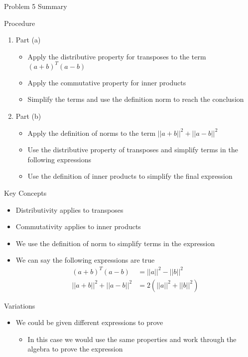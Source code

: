 \begin{summary}{Problem 5 Summary}
    \begin{statement}{Procedure}
        \begin{enumerate}[label = (\alph*)]
            \item Part (a)
            \begin{itemize}
                \item Apply the distributive property for transposes to the term $(a+b)^{T}(a-b)$
                \item Apply the commutative property for inner products 
                \item Simplify the terms and use the definition norm to reach the conclusion
            \end{itemize}
            \item Part (b)
            \begin{itemize}
                \item Apply the definition of norms to the term $||a+b||^{2} + ||a-b||^{2}$
                \item Use the distributive property of transposes and simplify terms in the following expressions
                \item Use the definition of inner products to simplify the final expression
            \end{itemize}
        \end{enumerate}
    \end{statement}
    \begin{statement}{Key Concepts}
        \begin{itemize}
            \item Distributivity applies to transposes
            \item Commutativity applies to inner products
            \item We use the definition of norm to simplify terms in the expression
            \item We can say the following expressions are true
            \begin{align*}
                (a+b)^{T}(a-b) & = ||a||^{2} - ||b||^{2} \\
                ||a+b||^{2} + ||a-b||^{2} & = 2(||a||^{2}+||b||^{2})
            \end{align*}
        \end{itemize}
    \end{statement}
    \begin{statement}{Variations}
        \begin{itemize}
            \item We could be given different expressions to prove
            \begin{itemize}
                \item In this case we would use the same properties and work through the algebra to prove the expression
            \end{itemize}
        \end{itemize}
    \end{statement}
\end{summary}

